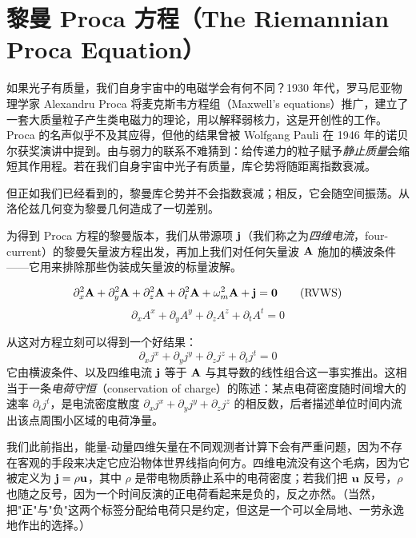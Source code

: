 \section{黎曼 Proca 方程（The Riemannian Proca Equation）}

如果光子有质量，我们自身宇宙中的电磁学会有何不同？1930 年代，罗马尼亚物理学家 Alexandru Proca 将麦克斯韦方程组（Maxwell's equations）推广，建立了一套大质量粒子产生类电磁力的理论，用以解释弱核力，这是开创性的工作。Proca 的名声似乎不及其应得，但他的结果曾被 Wolfgang Pauli 在 1946 年的诺贝尔获奖演讲中提到。由与弱力的联系不难猜到：给传递力的粒子赋予\emph{静止质量}会缩短其作用程。若在我们自身宇宙中光子有质量，库仑势将随距离指数衰减。

但正如我们已经看到的，黎曼库仑势并不会指数衰减；相反，它会随空间振荡。从洛伦兹几何变为黎曼几何造成了一切差别。

为得到 Proca 方程的黎曼版本，我们从带源项 $\mathbf{j}$（我们称之为\emph{四维电流}，four-current）的黎曼矢量波方程出发，再加上我们对任何矢量波 $\mathbf{A}$ 施加的横波条件——它用来排除那些伪装成矢量波的标量波解。

\begin{equation}
\partial_{x}^{2}\mathbf{A} + \partial_{y}^{2}\mathbf{A} + \partial_{z}^{2}\mathbf{A} + \partial_{t}^{2}\mathbf{A} + \omega_m^{2}\mathbf{A} + \mathbf{j} = \mathbf{0} \tag{RVWS}
\end{equation}
\begin{equation}
\partial_{x} A^{x} + \partial_{y} A^{y} + \partial_{z} A^{z} + \partial_{t} A^{t} = 0 \tag{Transverse}
\end{equation}

从这对方程立刻可以得到一个好结果：
\begin{equation}
\partial_{x} j^{x} + \partial_{y} j^{y} + \partial_{z} j^{z} + \partial_{t} j^{t} = 0 \tag{1}
\end{equation}
它由横波条件、以及四维电流 $\mathbf{j}$ 等于 $\mathbf{A}$ 与其导数的线性组合这一事实推出。这相当于一条\emph{电荷守恒}（conservation of charge）的陈述：某点电荷密度随时间增大的速率 $\partial_t j^t$，是电流密度散度 $\partial_x j^x + \partial_y j^y + \partial_z j^z$ 的相反数，后者描述单位时间内流出该点周围小区域的电荷净量。

我们此前指出，能量-动量四维矢量在不同观测者计算下会有严重问题，因为不存在客观的手段来决定它应沿物体世界线指向何方。四维电流没有这个毛病，因为它被定义为 $\mathbf{j} = \rho\mathbf{u}$，其中 $\rho$ 是带电物质静止系中的电荷密度；若我们把 $\mathbf{u}$ 反号，$\rho$ 也随之反号，因为一个时间反演的正电荷看起来是负的，反之亦然。（当然，把"正"与"负"这两个标签分配给电荷只是约定，但这是一个可以全局地、一劳永逸地作出的选择。）

